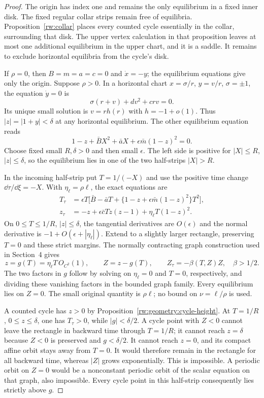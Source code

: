 \begin{proof}
The origin has index one and remains the only equilibrium in a
fixed inner disk. The fixed regular collar strips remain free of
equilibria. Proposition~\ref{rw:collar} places every counted
cycle essentially in the collar, surrounding that disk. The upper
vertex calculation in that proposition leaves at most one additional
equilibrium in the upper chart, and it is a saddle.
It remains to exclude horizontal equilibria from the cycle's disk.

If $\rho=0$, then $B=m=a=c=0$ and $\dot x=-y$; the
equilibrium equations give only the origin. Suppose $\rho>0$.
In a horizontal chart $x=\sigma/r$, $y=v/r$, $\sigma=\pm1$,
the equation $\dot y=0$ is
\[
 \sigma(r+v)+dv^2+crv=0.
\]
Its unique small solution is $v=rh(r)$ with $h=-1+o(1)$.
Thus $|z|=|1+y|<\delta$ at any horizontal equilibrium.
The other equilibrium equation reads
\[
 1-z+\bar BX^2+\bar aX+\epsilon\bar m(1-z)^2=0.
\]
Choose fixed small $R,\delta>0$ and then small $\epsilon$.
The left side is positive for $|X|\le R$, $|z|\le\delta$,
so the equilibrium lies in one of the two half-strips $|X|>R$.

In the incoming half-strip put $T=1/(-X)$ and use the positive
time change $\dd\tau/\dd\xi=-X$. With
$\eta_\ell=\rho\ell$, the exact equations are
\begin{equation}\label{rw:fibre:horizontal-equilibrium-field}
\begin{split}
 T_\tau&=\epsilon T\bigl[\bar B-\bar aT+
        \{1-z+\epsilon\bar m(1-z)^2\}T^2\bigr],\\
 z_\tau&=-z+\epsilon\bar cTz(z-1)
                             +\eta_\ell T(1-z)^2 .
\end{split}
\end{equation}
On $0\le T\le1/R$, $|z|\le\delta$, the tangential derivatives
are $O(\epsilon)$ and the normal derivative is
$-1+O(\epsilon+|\eta_\ell|)$.
Extend to a slightly larger rectangle, preserving $T=0$ and
these strict margins. The normally contracting graph construction
used in Section~4 gives
\[
 z=g(T)=\eta_\ell T\,O_{C^2}(1),\qquad
 Z=z-g(T),\qquad Z_\tau=-\beta(T,Z)Z,\quad\beta>1/2.
\]
The two factors in $g$ follow by solving on $\eta_\ell=0$
and $T=0$, respectively, and dividing these vanishing factors
in the bounded graph family. Every equilibrium lies on $Z=0$.
The small original quantity is $\rho\ell$; no bound on
$\nu=\ell/\rho$ is used.

A counted cycle has $z>0$ by
Proposition~\ref{rw:geometry:cycle-height}. At $T=1/R$,
$0\le z\le\delta$, one has $T_\tau>0$, while
$|g|<\delta/2$. A cycle point with $Z<0$ cannot leave the
rectangle in backward time through $T=1/R$; it cannot reach
$z=\delta$ because $Z<0$ is preserved and $g<\delta/2$.
It cannot reach $z=0$, and its compact affine orbit stays away
from $T=0$. It would therefore remain in the rectangle for
all backward time, whereas $|Z|$ grows exponentially.
This is impossible. A periodic orbit on $Z=0$ would be a
nonconstant periodic orbit of the scalar equation on that graph,
also impossible. Every cycle point in this half-strip consequently
lies strictly above $g$.


\end{proof}
